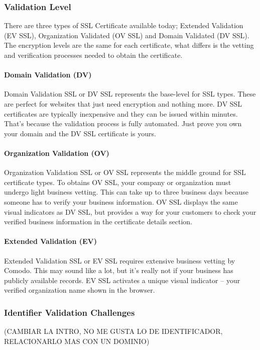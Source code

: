 \subsubsection{Validation Level}
There are three types of SSL Certificate available today; Extended Validation 
(EV SSL), Organization Validated (OV SSL) and Domain Validated (DV SSL). The 
encryption levels are the same for each certificate, what differs is the vetting
 and verification processes needed to obtain the certificate.
\paragraph{Domain Validation (DV)}
Domain Validation SSL or DV SSL represents the base-level for SSL types. These 
are perfect for websites that just need encryption and nothing more. DV SSL 
certificates are typically inexpensive and they can be issued within minutes. That's 
because the validation process is fully automated. Just prove you own your domain 
and the DV SSL certificate is yours.
\paragraph{Organization Validation (OV)}
Organization Validation SSL or OV SSL represents the middle ground for SSL certificate 
types. To obtains OV SSL, your company or organization must undergo light business
 vetting. This can take up to three business days because someone has to verify 
 your business information. OV SSL displays the same visual indicators as DV SSL,
  but provides a way for your customers to check your verified business information 
  in the certificate details section.
\paragraph{Extended Validation (EV)}
Extended Validation SSL or EV SSL requires extensive business vetting by Comodo. This
 may sound like a lot, but it's really not if your business has publicly available 
 records. EV SSL activates a unique visual indicator – your verified organization name
  shown in the browser.

  
\subsubsection{Identifier Validation Challenges}

(CAMBIAR LA INTRO, NO ME GUSTA LO DE IDENTIFICADOR, RELACIONARLO MAS CON UN DOMINIO)


